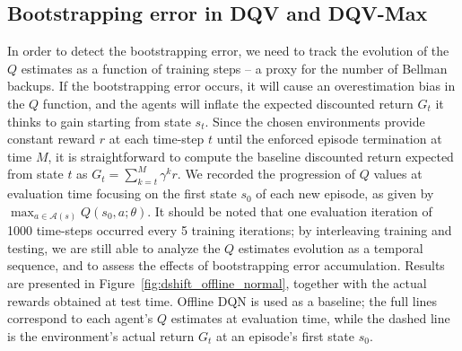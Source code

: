 \subsection{Bootstrapping error in DQV and DQV-Max}\label{sec:methods_be_dqv_dqvmax}
In order to detect the bootstrapping error, we need to track the
evolution of the $Q$ estimates as a function of training steps -- a
proxy for the number of Bellman backups. If the
bootstrapping error occurs, it will cause an overestimation bias in
the $Q$ function, and the agents will inflate the expected discounted
return $G_t$ it thinks to gain starting from state $s_t$. Since the
chosen environments provide constant reward $r$ at each time-step $t$
until the enforced episode termination at time $M$, it is
straightforward to compute the baseline discounted return expected
from state $t$ as $G_t=\sum^{M}_{k=t}\gamma^{k}r$.
We recorded the progression of $Q$ values at evaluation time focusing
on the first state $s_0$ of each new episode, as given by $\max_{a\in
  \mathcal{A}\left(s\right)}Q\left(s_0,a;\theta\right)$. It should be
noted that one evaluation iteration of 1000 time-steps occurred every
5 training iterations; by interleaving training and testing, we are
still able to analyze the $Q$ estimates evolution as a temporal
sequence, and to assess the effects of bootstrapping error
accumulation. Results are presented in
Figure~\ref{fig:dshift_offline_normal}, together with the actual
rewards obtained at test time. Offline DQN is used as a baseline; the
full lines correspond to each agent's $Q$ estimates at evaluation
time, while the dashed line is the environment's actual return $G_t$
at an episode's first state $s_0$.

